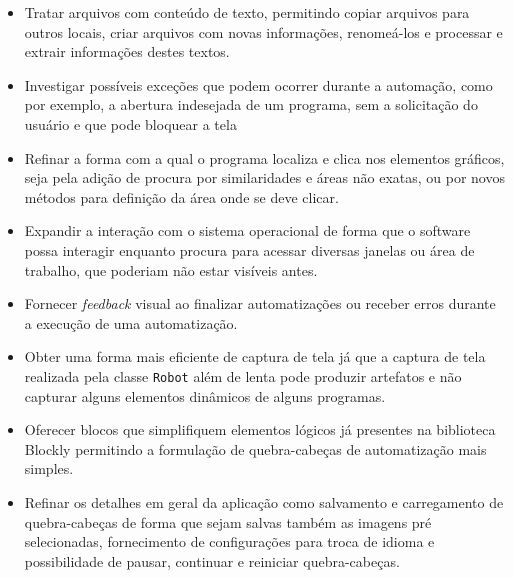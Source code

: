\documentclass[tg]{mdtufsm}
\begin{document}
            \begin{itemize}
            	\item Tratar arquivos com conteúdo de texto, permitindo copiar arquivos para outros locais, criar arquivos com novas informações, renomeá-los e processar e extrair informações destes textos.
                \item Investigar possíveis exceções que podem ocorrer durante a automação, como por exemplo, a abertura indesejada de um programa, sem a solicitação do usuário e que pode bloquear a tela
                \item Refinar a forma com a qual o programa localiza e clica nos elementos gráficos, seja pela adição de procura por similaridades e áreas não exatas, ou por novos métodos para definição da área onde se deve clicar.
                \item Expandir a interação com o sistema operacional de forma que o software possa interagir enquanto procura para acessar diversas janelas ou área de trabalho, que poderiam não estar visíveis antes.
            	\item Fornecer \emph{feedback} visual ao finalizar automatizações ou receber erros durante a execução de uma automatização.
            	\item Obter uma forma mais eficiente de captura de tela já que a captura de tela realizada pela classe \texttt{Robot} além de lenta pode produzir artefatos e não capturar alguns elementos dinâmicos de alguns programas.
                \item Oferecer blocos que simplifiquem elementos lógicos já presentes na biblioteca Blockly permitindo a formulação de quebra-cabeças de automatização mais simples.
                \item Refinar os detalhes em geral da aplicação como salvamento e carregamento de quebra-cabeças de forma que sejam salvas também as imagens pré selecionadas, fornecimento de configurações para troca de idioma e possibilidade de pausar, continuar e reiniciar quebra-cabeças.
            \end{itemize}

	\setlength{\baselineskip}{\baselineskip}
	
	
\end{document}
